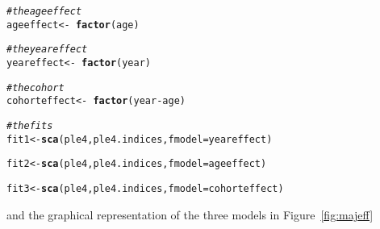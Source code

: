 \documentclass[a4paper,english,10pt]{article}\usepackage[]{graphicx}\usepackage[]{color}
\makeatletter
\newcommand{\hlcom}[1]{\textcolor[rgb]{0.678,0.584,0.686}{\textit{#1}}}%
\newcommand{\hlopt}[1]{\textcolor[rgb]{0,0,0}{#1}}%
\newcommand{\hlstd}[1]{\textcolor[rgb]{0.345,0.345,0.345}{#1}}%
\newcommand{\hlkwb}[1]{\textcolor[rgb]{0.69,0.353,0.396}{#1}}%
\newcommand{\hlkwc}[1]{\textcolor[rgb]{0.333,0.667,0.333}{#1}}%
\newcommand{\hlkwd}[1]{\textcolor[rgb]{0.737,0.353,0.396}{\textbf{#1}}}%
\newenvironment{kframe}{%
 \def\at@end@of@kframe{}%
 \ifinner\ifhmode%
  \def\at@end@of@kframe{\end{minipage}}%
  \begin{minipage}{\columnwidth}%
 \fi\fi%
 \def\FrameCommand##1{\hskip\@totalleftmargin \hskip-\fboxsep
 \colorbox{shadecolor}{##1}\hskip-\fboxsep
     \hskip-\linewidth \hskip-\@totalleftmargin \hskip\columnwidth}%
 \MakeFramed {\advance\hsize-\width
   \@totalleftmargin\z@ \linewidth\hsize
   \@setminipage}}%
 {\par\unskip\endMakeFramed%
 \at@end@of@kframe}
\newenvironment{knitrout}{}{} %
\makeatother
\begin{document}
\begin{knitrout}
\color{fgcolor}\begin{kframe}
\begin{alltt}
\hlcom{# the age effect}
\hlstd{ageeffect} \hlkwb{<-} \hlopt{~} \hlkwd{factor}\hlstd{(age)}

\hlcom{# the year effect}
\hlstd{yeareffect} \hlkwb{<-} \hlopt{~} \hlkwd{factor}\hlstd{(year)}

\hlcom{# the cohort }
\hlstd{cohorteffect} \hlkwb{<-} \hlopt{~} \hlkwd{factor}\hlstd{(year}\hlopt{-}\hlstd{age)}

\hlcom{# the fits}
\hlstd{fit1} \hlkwb{<-} \hlkwd{sca}\hlstd{(ple4, ple4.indices,} \hlkwc{fmodel}\hlstd{=yeareffect)}
\end{alltt}


{\ttfamily\noindent\bfseries{}}\begin{alltt}
\hlstd{fit2} \hlkwb{<-} \hlkwd{sca}\hlstd{(ple4, ple4.indices,} \hlkwc{fmodel}\hlstd{=ageeffect)}
\end{alltt}


{\ttfamily\noindent\bfseries{}}\begin{alltt}
\hlstd{fit3} \hlkwb{<-} \hlkwd{sca}\hlstd{(ple4, ple4.indices,} \hlkwc{fmodel}\hlstd{=cohorteffect)}
\end{alltt}


{\ttfamily\noindent\bfseries{}}\end{kframe}
\end{knitrout}

and the graphical representation of the three models in Figure~\ref{fig:majeff}
\end{document}
